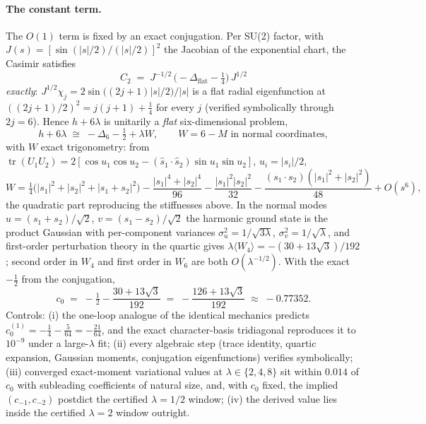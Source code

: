 \documentclass[11pt]{article}
\theoremstyle{definition}
\theoremstyle{remark}
\begin{document}
\paragraph{The constant term.}  The $O(1)$ term is fixed by an exact
conjugation.  Per SU(2) factor, with $J(s) = [\sin(|s|/2)/(|s|/2)]^2$
the Jacobian of the exponential chart, the Casimir satisfies
\[
C_2 \;=\; J^{-1/2}\,\big(-\Delta_{\mathrm{flat}} -
\tfrac14\big)\,J^{1/2}
\]
\emph{exactly}: $J^{1/2}\chi_j = 2\sin\!\big((2j{+}1)|s|/2\big)/|s|$ is
a flat radial eigenfunction at $((2j{+}1)/2)^2 = j(j{+}1) + \tfrac14$
for every $j$ (verified symbolically through $2j = 6$).  Hence
$h + 6\lambda$ is unitarily a \emph{flat} six-dimensional problem,
\[
h + 6\lambda \;\cong\; -\Delta_6 - \tfrac12 + \lambda W, \qquad
W = 6 - M \text{ in normal coordinates},
\]
with $W$ exact trigonometry: from $\operatorname{tr}(U_1U_2) =
2[\cos u_1 \cos u_2 - (\hat s_1 \!\cdot \hat s_2)\sin u_1 \sin u_2]$,
$u_i = |s_i|/2$,
\[
W = \tfrac14\big(|s_1|^2 + |s_2|^2 + |s_1{+}s_2|^2\big)
- \frac{|s_1|^4 + |s_2|^4}{96} - \frac{|s_1|^2|s_2|^2}{32}
- \frac{(s_1\!\cdot s_2)(|s_1|^2 + |s_2|^2)}{48} + O(s^6),
\]
the quadratic part reproducing the stiffnesses above.  In the normal
modes $u = (s_1{+}s_2)/\sqrt2$, $v = (s_1{-}s_2)/\sqrt2$ the harmonic
ground state is the product Gaussian with per-component variances
$\sigma_u^2 = 1/\sqrt{3\lambda}$, $\sigma_v^2 = 1/\sqrt{\lambda}$, and
first-order perturbation theory in the quartic gives
$\lambda\langle W_4\rangle = -(30 + 13\sqrt3)/192$; second order in
$W_4$ and first order in $W_6$ are both $O(\lambda^{-1/2})$.  With the
exact $-\tfrac12$ from the conjugation,
\[
c_0 \;=\; -\tfrac12 - \frac{30 + 13\sqrt3}{192}
\;=\; -\frac{126 + 13\sqrt3}{192} \;\approx\; -0.77352.
\]
Controls: (i) the one-loop analogue of the identical mechanics
predicts $c_0^{(1)} = -\tfrac14 - \tfrac{5}{64} = -\tfrac{21}{64}$,
and the exact character-basis tridiagonal reproduces it to $10^{-9}$
under a large-$\lambda$ fit; (ii) every algebraic step (trace
identity, quartic expansion, Gaussian moments, conjugation
eigenfunctions) verifies symbolically; (iii) converged exact-moment
variational values at $\lambda \in \{2,4,8\}$ sit within $0.014$ of
$c_0$ with subleading coefficients of natural size, and, with $c_0$
fixed, the implied $(c_{-1}, c_{-2})$ postdict the certified
$\lambda = 1/2$ window; (iv) the derived value lies inside the
certified $\lambda = 2$ window outright.
\end{document}
